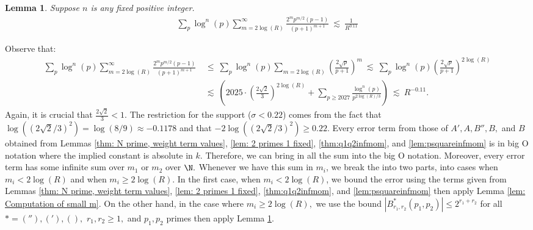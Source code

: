 \documentclass[11pt, reqno]{amsart}
\makeatletter
\renewenvironment{proof}[1][\proofname]{\par
  \vspace{-.7\topsep}%
  \pushQED{\qed}%
  \normalfont
  \topsep0pt \partopsep0pt %
  \trivlist
  \item[\hskip\labelsep
        \itshape
    #1\@addpunct{.}]\ignorespaces
}{%
  \popQED\endtrivlist\@endpefalse
  \addvspace{6pt plus 6pt} %
}
\newtheorem{lemma}[theorem]{Lemma}
\theoremstyle{definition}
\theoremstyle{remark}
\numberwithin{equation}{section}
\makeatother
\begin{document}
\begin{lemma} \label{lem: Computation of tail m}Suppose $n$ is any fixed positive integer.
\begin{align}
    \sum_{p} \log^n(p) \sum_{m=2\log(R)}^{\infty} \frac{2^{m}p^{m/2}(p-1)}{(p+1)^{m+1}} \ \lesssim \ \frac{1}{R^{0.11}}
\end{align}
\end{lemma}
\begin{proof} Observe that:
    \begin{align*}
         \sum_{p} \log^n(p) \sum_{m=2\log(R)}^{\infty} \frac{2^{m}p^{m/2}(p-1)}{(p+1)^{m+1}} &\ \leq\ \sum_{p} \log^n(p) \sum_{m=2\log(R)}\left(\frac{2\sqrt{p}}{p+1}\right)^m \ \lesssim\ \sum_{p}\log^n(p) \left(\frac{2\sqrt{p}}{p+1}\right)^{2\log(R)} \\
         &\ \lesssim\ \left(2025 \cdot \left(\frac{2\sqrt{2}}{3}\right)^{2\log(R)} +\sum_{p \geq 2027} \frac{\log^n(p)}{p^{2\log(R)/3}}\right) \ \lesssim\ {R^{-0.11}}.
    \end{align*}
   Again, it is crucial that $\frac{2\sqrt{2}}{3}<1$. The restriction for the support ($\sigma < 0.22$) comes from the fact that $\log(({2\sqrt{2}}/{3})^2) = \log(8/9) \approx -0.1178$ and that $-2\log(({2\sqrt{2}}/{3})^2) \geq0.22$.
\end{proof}
Every error term from those of $A', A, B'', B,$ and $B$ obtained from Lemmas \ref{thm: N prime, weight term values}, \ref{lem: 2 primes 1 fixed}, \ref{thm:q1q2infmom}, and \ref{lem:psquareinfmom} is in big O notation where the implied constant is absolute in $k.$ Therefore, we can bring in all the sum into the big O notation. Moreover, every error term has some infinite sum over $m_1$ or $m_2$ over $\N.$ Whenever we have this sum in $m_i$, we break the into two parts, into cases when $m_i  < 2\log(R)$ and when $m_i \geq 2\log(R).$ In the first case, when $m_i  < 2\log(R)$, we bound the error using the terms given from Lemmas \ref{thm: N prime, weight term values}, \ref{lem: 2 primes 1 fixed}, \ref{thm:q1q2infmom}, and \ref{lem:psquareinfmom} then apply Lemma \ref{lem: Computation of small m}. On the other hand, in the case where $m_i \geq 2\log(R),$ we use the bound $|B^*_{r_1,r_2}(p_1,p_2)|\leq 2^{r_1+r_2}$ for all $* = (''), ('), (),$ $r_1,r_2 \geq 1,$ and $p_1,p_2$ primes then apply Lemma \ref{lem: Computation of tail m}. 
\end{document}
